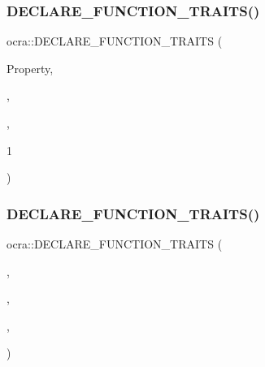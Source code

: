 \subsubsection{\texorpdfstring{D\+E\+C\+L\+A\+R\+E\+\_\+\+F\+U\+N\+C\+T\+I\+O\+N\+\_\+\+T\+R\+A\+I\+T\+S()}{DECLARE\_FUNCTION\_TRAITS()}\hspace{0.1cm}{\footnotesize\ttfamily [1/13]}}
{\footnotesize\ttfamily ocra\+::\+D\+E\+C\+L\+A\+R\+E\+\_\+\+F\+U\+N\+C\+T\+I\+O\+N\+\_\+\+T\+R\+A\+I\+TS (\begin{DoxyParamCaption}\item[{\hyperlink{namespaceocra_a40ddbec106a6034cd2047bba9945b568}{e\+Function\+Ability}}]{Property,  }\item[{int}]{,  }\item[{update\+Property}]{,  }\item[{-\/}]{1 }\end{DoxyParamCaption})}

\hypertarget{namespaceocra_a824e1cafb06db3d3a54da47469c8e234}{}\label{namespaceocra_a824e1cafb06db3d3a54da47469c8e234} 
\subsubsection{\texorpdfstring{D\+E\+C\+L\+A\+R\+E\+\_\+\+F\+U\+N\+C\+T\+I\+O\+N\+\_\+\+T\+R\+A\+I\+T\+S()}{DECLARE\_FUNCTION\_TRAITS()}\hspace{0.1cm}{\footnotesize\ttfamily [2/13]}}
{\footnotesize\ttfamily ocra\+::\+D\+E\+C\+L\+A\+R\+E\+\_\+\+F\+U\+N\+C\+T\+I\+O\+N\+\_\+\+T\+R\+A\+I\+TS (\begin{DoxyParamCaption}\item[{$<$ \hyperlink{namespaceocra_a40ddbec106a6034cd2047bba9945b568acfb47b20329993093d2022b017239bd8}{F\+U\+N\+\_\+\+V\+A\+L\+UE} $>$}]{,  }\item[{Vector\+Xd}]{,  }\item[{update\+Value}]{,  }\item[{\hyperlink{namespaceocra_a40ddbec106a6034cd2047bba9945b568acfb47b20329993093d2022b017239bd8}{F\+U\+N\+\_\+\+V\+A\+L\+UE}}]{ }\end{DoxyParamCaption})}

\hypertarget{namespaceocra_af847bdc711cc6063b38424bb15f93af1}{}\label{namespaceocra_af847bdc711cc6063b38424bb15f93af1} 
